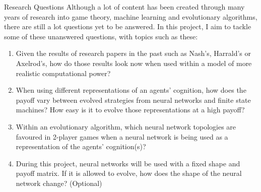 \documentclass[12pt,a4paper]{article}
\makeatletter
\renewcommand\subsection{\@startsection {subsection}{1}{2mm}
                               {3pt plus 2pt minus 1pt}
                               {3pt plus 0pt}
                               {\normalfont\bfseries}}
\makeatother
\begin{document}
\subsection{Research Questions}
Although a lot of content has been created through many years of research into game theory, machine learning and evolutionary algorithms, there are still a lot questions yet to be answered. In this project, I aim to tackle some of these unanswered questions, with topics such as these:

\begin{enumerate}
\item Given the results of research papers in the past such as Nash's, Harrald's or Axelrod's, how do those results look now when used within a model of more realistic computational power?
\item When using different representations of an agents' cognition, how does the payoff vary between evolved strategies from neural networks and finite state machines? How easy is it to evolve those representations at a high payoff?
\item Within an evolutionary algorithm, which neural network topologies are favoured in 2-player games when a neural network is being used as a representation of the agents' cognition(s)?
\item During this project, neural networks will be used with a fixed shape and payoff matrix. If it is allowed to evolve, how does the shape of the neural network change? (Optional) \\
\end{enumerate} 
\end{document}
